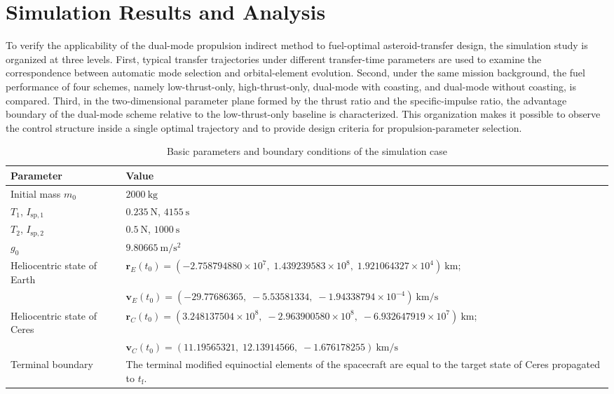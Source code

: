 ﻿\documentclass{IEEEtaes}
\begin{document}
\section{Simulation Results and Analysis}

To verify the applicability of the dual-mode propulsion indirect method to fuel-optimal asteroid-transfer design, the simulation study is organized at three levels. First, typical transfer trajectories under different transfer-time parameters are used to examine the correspondence between automatic mode selection and orbital-element evolution. Second, under the same mission background, the fuel performance of four schemes, namely low-thrust-only, high-thrust-only, dual-mode with coasting, and dual-mode without coasting, is compared. Third, in the two-dimensional parameter plane formed by the thrust ratio and the specific-impulse ratio, the advantage boundary of the dual-mode scheme relative to the low-thrust-only baseline is characterized. This organization makes it possible to observe the control structure inside a single optimal trajectory and to provide design criteria for propulsion-parameter selection.

\begin{table}[!t]
\caption{Basic parameters and boundary conditions of the simulation case}
\label{tab:basic-parameters}
\centering
\footnotesize
\begin{tabular}{p{}p{}}
\toprule
Parameter & Value \\
\midrule
Initial mass $m_0$ & $2000~\mathrm{kg}$ \\
$T_1$, $I_{\mathrm{sp},1}$ & $0.235~\mathrm{N}$, $4155~\mathrm{s}$ \\
$T_2$, $I_{\mathrm{sp},2}$ & $0.5~\mathrm{N}$, $1000~\mathrm{s}$ \\
$g_0$ & $9.80665~\mathrm{m/s^2}$ \\
Heliocentric state of Earth & $\bm r_E(t_0)=(-2.758794880\times10^7,\;1.439239583\times10^8,\;1.921064327\times10^4)~\mathrm{km}$; \\
 & $\bm v_E(t_0)=(-29.77686365,\;-5.53581334,\;-1.94338794\times10^{-4})~\mathrm{km/s}$ \\
Heliocentric state of Ceres & $\bm r_C(t_0)=(3.248137504\times10^8,\;-2.963900580\times10^8,\;-6.932647919\times10^7)~\mathrm{km}$;\\
 & $\bm v_C(t_0)=(11.19565321,\;12.13914566,\;-1.676178255)~\mathrm{km/s}$ \\
Terminal boundary & The terminal modified equinoctial elements of the spacecraft are equal to the target state of Ceres propagated to $t_{\mathrm{f}}$. \\
\bottomrule
\end{tabular}
\end{table}
\end{document}
